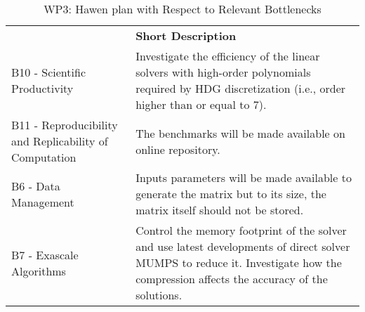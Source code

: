 \begin{table}[h!]
    \centering
    
    

    \centering
    { 
        \setlength{\parindent}{0pt}
        \def\arraystretch{1.25}
        {
            \fontsize{9}{11}\selectfont
            \begin{tabular}{!{\color{numpexgray}\vrule}p{.25\linewidth}!{\color{numpexgray}\vrule}p{.6885\linewidth}!{\color{numpexgray}\vrule}}
    
     &  {\rule{0pt}{2.5ex}\color{white}\bf Short Description }\\ 
    
    B10 - Scientific Productivity & 
Investigate the efficiency of the linear solvers with high-order polynomials
required by HDG discretization (i.e., order higher than or equal to 7). \\
    B11 - Reproducibility and Replicability of Computation 
& The benchmarks will be made available on online repository. \\
    B6 - Data Management 
&  Inputs parameters will be made available to generate the matrix but to its size, the matrix
   itself should not be stored.\\
    B7 - Exascale Algorithms & 
Control the memory footprint of the solver and use latest developments of direct solver 
MUMPS to reduce it. Investigate how the compression affects the accuracy of the solutions.\\
\end{tabular}
        }
    }
    \caption{WP3: Hawen plan with Respect to Relevant Bottlenecks}
    \label{tab:WP3:Hawen:bottlenecks}
\end{table}
